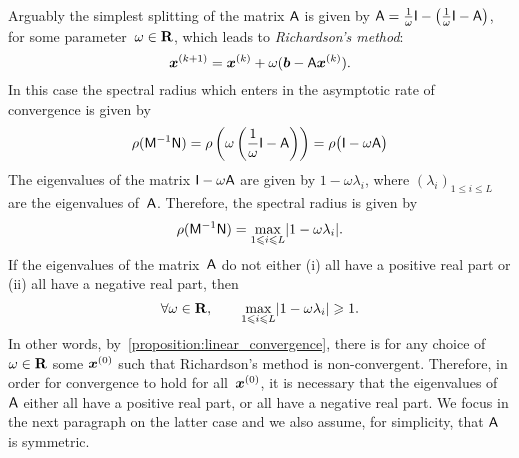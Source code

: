 Arguably the simplest splitting of the matrix $\mathsf A$ is given by $\mathsf A = \frac{1}{\omega} \mathsf I - \bigl(\frac{1}{\omega} \mathsf I - \mathsf A\bigr)$,
for some parameter~$\omega \in \mathbf R$,
which leads to \emph{Richardson's method}:
\begin{equation}
    \label{eq:linear_richardson}
    \mathbf{\boldsymbol{x}}^{(k+1)} = \mathbf{\boldsymbol{x}}^{(k)} +  \omega (\mathbf{\boldsymbol{b}} - \mathsf A \mathbf{\boldsymbol{x}}^{(k)}).
\end{equation}
In this case the spectral radius which enters in the asymptotic rate of convergence is given by
\[
    \rho(\mathsf M^{-1} \mathsf N)
    = \rho\left(\omega \left(\frac{1}{\omega} \mathsf I - \mathsf A\right) \right)
    = \rho\bigl( \mathsf I - \omega \mathsf A \bigr)
\]
The eigenvalues of the matrix $\mathsf I - \omega \mathsf A$ are given by $1 - \omega \lambda_i$,
where $(\lambda_i)_{1 \leq i \leq L}$ are the eigenvalues of~$\mathsf A$.
Therefore, the spectral radius is given by
\[
    \rho(\mathsf M^{-1} \mathsf N)
    = \max_{1 \leqslant i \leqslant L} \lvert1  - \omega \lambda_i\rvert.
\]
If the eigenvalues of the matrix~$\mathsf A$ do not either (i) all have a positive real part or (ii) all have a negative real part,
then
\[
    \forall \omega \in \mathbf R,
    \qquad \max_{1 \leqslant i \leqslant L} \lvert1  - \omega \lambda_i\rvert \geqslant 1.
\]
In other words,
by~\cref{proposition:linear_convergence},
there is for any choice of~$\omega \in \mathbf R$ some $\mathbf{\boldsymbol{x}}^{(0)}$ such that Richardson's method is non-convergent.
Therefore, in order for convergence to hold for all~$\mathbf{\boldsymbol{x}}^{(0)}$,
it is necessary that the eigenvalues of $\mathsf A$ either all have a positive real part,
or all have a negative real part.
We focus in the next paragraph on the latter case and we also assume,
for simplicity, that $\mathsf A$ is symmetric.

